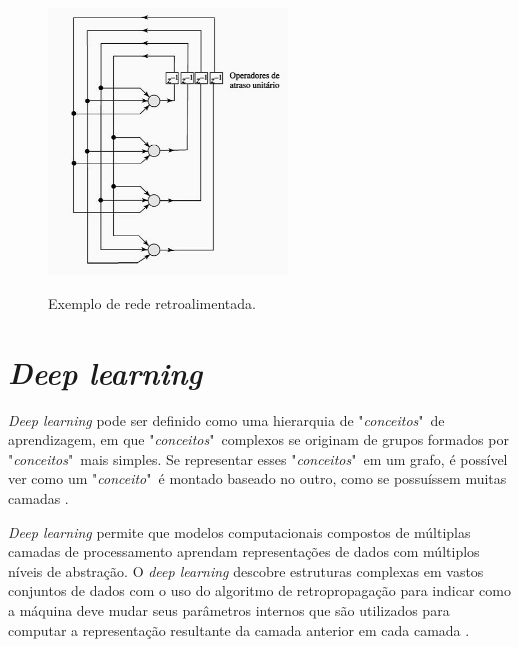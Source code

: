 \begin{itemize}
\begin{figure}[H]
  \centering
  \caption{Exemplo de rede retroalimentada.}
  \includegraphics[width=180pt]{dados/figuras/retroalimentacao}
  \label{fig:retroalimentacao}
\end{figure}
\end{itemize}
\section{\textit{Deep learning}}
\label{chap:deeplearning}
\textit{Deep learning} pode ser definido como uma hierarquia de "\textit{conceitos}"\  de aprendizagem, em que "\textit{conceitos}"\  complexos se originam de grupos formados por "\textit{conceitos}"\  mais simples. Se representar esses "\textit{conceitos}"\  em um grafo, é possível ver como um "\textit{conceito}"\  é montado baseado no outro, como se possuíssem muitas camadas \cite{Goodfellow-et-al-2016}.

\begin{citacao}
    \textit{Deep learning} permite que modelos computacionais compostos de múltiplas camadas de processamento aprendam representações de dados com múltiplos níveis de abstração.
   O  \textit{deep learning} descobre estruturas complexas em vastos conjuntos de dados com o uso do algoritmo de retropropagação para indicar como a máquina deve mudar seus parâmetros internos que são utilizados para computar a representação resultante da camada anterior em cada camada \cite{lecun2015deep}.
\end{citacao}

